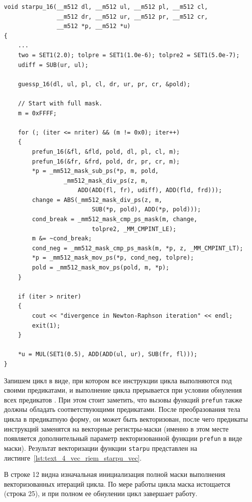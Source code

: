 \begin{lstlisting}[caption={Векторизованная версия функции \texttt{starpu}.},label={lst:text_4_vec_riem_starpu_vec}]
void starpu_16(__m512 dl, __m512 ul, __m512 pl, __m512 cl,
               __m512 dr, __m512 ur, __m512 pr, __m512 cr,
               __m512 *p, __m512 *u)
{
    ...
    two = SET1(2.0); tolpre = SET1(1.0e-6); tolpre2 = SET1(5.0e-7);
    udiff = SUB(ur, ul);

    guessp_16(dl, ul, pl, cl, dr, ur, pr, cr, &pold);

    // Start with full mask.
    m = 0xFFFF;

    for (; (iter <= nriter) && (m != 0x0); iter++)
    {
        prefun_16(&fl, &fld, pold, dl, pl, cl, m);
        prefun_16(&fr, &frd, pold, dr, pr, cr, m);
        *p = _mm512_mask_sub_ps(*p, m, pold,
                 _mm512_mask_div_ps(z, m,
                     ADD(ADD(fl, fr), udiff), ADD(fld, frd)));
        change = ABS(_mm512_mask_div_ps(z, m,
                         SUB(*p, pold), ADD(*p, pold)));
        cond_break = _mm512_mask_cmp_ps_mask(m, change,
                         tolpre2, _MM_CMPINT_LE);
        m &= ~cond_break;
        cond_neg = _mm512_mask_cmp_ps_mask(m, *p, z, _MM_CMPINT_LT);
        *p = _mm512_mask_mov_ps(*p, cond_neg, tolpre);
        pold = _mm512_mask_mov_ps(pold, m, *p);
    }

    if (iter > nriter)
    {
        cout << "divergence in Newton-Raphson iteration" << endl;
        exit(1);
    }

    *u = MUL(SET1(0.5), ADD(ADD(ul, ur), SUB(fr, fl)));
}
\end{lstlisting}

Запишем цикл в виде, при котором все инструкции цикла выполняются под своими предикатами, и выполнение цикла прерывается при условии обнуления всех предикатов \cite{Krzikalla2026Vec}.
При этом стоит заметить, что вызовы функций \texttt{prefun} также должны обладать соответствующими предикатами.
После преобразования тела цикла в предикатную форму, он может быть векторизован, после чего предикаты инструкций заменятся на векторные регистры-маски (именно в этом месте появляется дополнительный параметр векторизованной функции \texttt{prefun} в виде маски).
Результат векторизации функции \texttt{starpu} представлен на листинге~\ref{lst:text_4_vec_riem_starpu_vec}.

В строке 12 видна изначальная инициализация полной маски выполнения векторизованных итераций цикла.
По мере работы цикла маска истощается (строка 25), и при полном ее обнулении цикл завершает работу.

